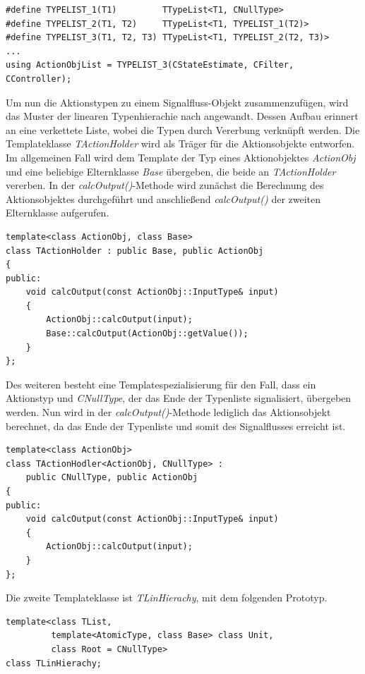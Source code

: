 \begin{lstlisting}[caption={Definition und Aufruf der Makors für verlängerte Typenlisten},captionpos=b]
#define TYPELIST_1(T1)         TTypeList<T1, CNullType>
#define TYPELIST_2(T1, T2) 	   TTypeList<T1, TYPELIST_1(T2)>
#define TYPELIST_3(T1, T2, T3) TTypeList<T1, TYPELIST_2(T2, T3)>
...
using ActionObjList = TYPELIST_3(CStateEstimate, CFilter, CController);
\end{lstlisting}
Um nun die Aktionstypen zu einem Signalfluss-Objekt zusammenzufügen, wird das Muster der linearen Typenhierachie nach \cite[S. 62 ff.]{ModernCpp} angewandt. Dessen Aufbau erinnert an eine verkettete Liste, wobei die Typen durch Vererbung verknüpft werden. Die Templateklasse \textit{TActionHolder} wird als Träger für die Aktionsobjekte entworfen.
Im allgemeinen Fall wird dem Template der Typ eines Aktionobjektes \textit{ActionObj} und eine beliebige Elternklasse \textit{Base} übergeben, die beide an \textit{TActionHolder} vererben. In der \textit{calcOutput()}-Methode wird zunächst die Berechnung des Aktionsobjektes durchgeführt und anschließend \textit{calcOutput()} der zweiten Elternklasse aufgerufen.
\begin{lstlisting}[caption={Templateklasse des Trägerobjektes},captionpos=b]
template<class ActionObj, class Base>
class TActionHolder : public Base, public ActionObj
{
public:
	void calcOutput(const ActionObj::InputType& input)
	{
		ActionObj::calcOutput(input);
		Base::calcOutput(ActionObj::getValue());
	}
};
\end{lstlisting}
Des weiteren besteht eine Templatespezialisierung für den Fall, dass ein Aktionstyp und \textit{CNullType}, der das Ende der Typenliste signalisiert, übergeben werden. Nun wird in der \textit{calcOutput()}-Methode lediglich das Aktionsobjekt berechnet, da das Ende der Typenliste und somit des Signalflusses erreicht ist.
\begin{lstlisting}[caption={Templatespezialisierung des Trägerobjektes für das Ende der Typenliste},captionpos=b]
template<class ActionObj>
class TActionHodler<ActionObj, CNullType> : 
	public CNullType, public ActionObj
{
public:
	void calcOutput(const ActionObj::InputType& input)
	{
		ActionObj::calcOutput(input);
	}
};
\end{lstlisting}
Die zweite Templateklasse ist \textit{TLinHierachy}, mit dem folgenden Prototyp.
\begin{lstlisting}[caption={Deklaration der Templateklasse für lineare Hierarchien {\cite[S. 63]{ModernCpp}} },captionpos=b]
template<class TList,
         template<AtomicType, class Base> class Unit,
         class Root = CNullType>
class TLinHierachy;
\end{lstlisting} 

